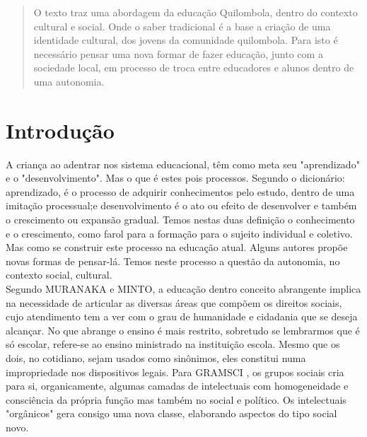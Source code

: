 \maketitle

\begin{abstract}
\noindent O texto traz uma abordagem da educação Quilombola, dentro do contexto cultural e social. Onde o saber tradicional é a base a criação de uma identidade cultural, dos jovens da comunidade quilombola. Para isto é necessário pensar uma nova formar de fazer educação, junto com a sociedade local, em processo de troca entre educadores e alunos dentro de uma autonomia.
\end{abstract}


\section*{Introdução}
\hspace{1.5cm}
A criança ao adentrar nos sistema educacional, têm como meta seu "aprendizado" e o "desenvolvimento". Mas o que é estes pois processos. Segundo o dicionário: aprendizado, é o processo de adquirir conhecimentos pelo estudo, dentro de uma imitação  processual;e desenvolvimento é o ato ou efeito de desenvolver e também o crescimento ou expansão gradual. Temos nestas duas definição o conhecimento e o crescimento, como farol para a formação para o sujeito individual e coletivo. Mas como se construir este processo na educação atual. Alguns autores propõe novas formas de pensar-lá. Temos neste processo a questão  da autonomia, no contexto social, cultural.\\

\hspace{1.5cm}
Segundo MURANAKA e MINTO\cite{muranakaeminto}, a educação dentro conceito abrangente implica na necessidade de articular as diversas áreas que compõem os direitos sociais, cujo atendimento tem a ver com o grau de humanidade e cidadania que se deseja alcançar. No que abrange o ensino é mais restrito, sobretudo se lembrarmos que é só escolar, refere-se ao ensino ministrado na instituição escola. Mesmo que os dois, no cotidiano, sejam usados como sinônimos, eles constitui numa impropriedade nos dispositivos legais. Para GRAMSCI \cite{gramsci}, os grupos sociais cria para si, organicamente, algumas camadas de intelectuais com homogeneidade e consciência da própria função mas também no social e político. Os intelectuais "orgânicos" gera consigo uma nova classe, elaborando aspectos do tipo social novo.\\


